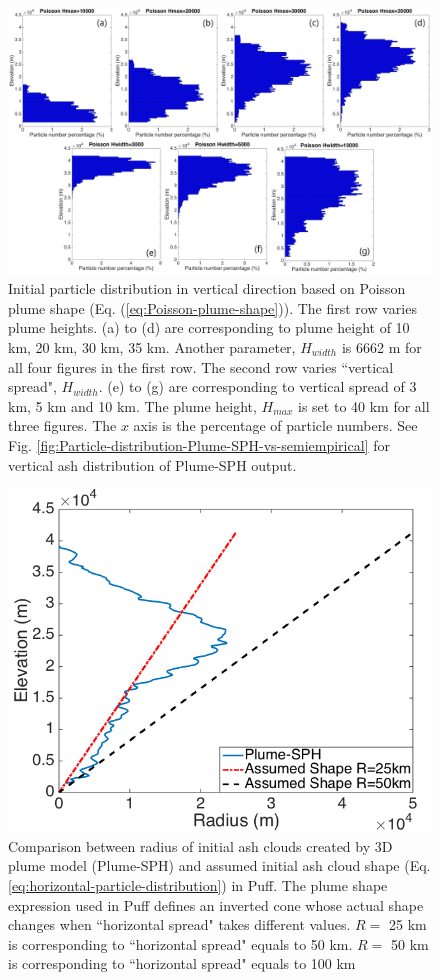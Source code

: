 \documentclass[utf8]{frontiersSCNS} %
\begin{document}
\begin{figure}[!htb]
\centering
\includegraphics[width=1.0\textwidth]{Figures/particle_distribution_vertical_calibration}
\caption{Initial particle distribution in vertical direction based on Poisson plume shape  (Eq. (\ref{eq:Poisson-plume-shape})). The first row varies plume heights. (a) to (d) are corresponding to plume height of 10 km, 20 km, 30 km, 35 km. Another parameter, $H_{width}$ is 6662 m for all four figures in the first row. The second row varies ``vertical spread", $H_{width}$. (e) to (g) are corresponding to vertical spread of 3 km, 5 km and 10 km. The plume height, $H_{max}$ is set to 40 km for all three figures. The $x$ axis is the percentage of particle numbers. See Fig. \ref{fig:Particle-distribution-Plume-SPH-vs-semiempirical} for vertical ash distribution of Plume-SPH output.}
\label{fig:Particle-distribution-Plume-calibrate-semiempirical}
\end{figure}

\begin{figure}[!htb]
\centering
\includegraphics[width=0.50 \textwidth]{Figures/radius-Plume-SPH-And-Assumed}
\caption{Comparison between radius of initial ash clouds created by 3D plume model (Plume-SPH) and assumed initial ash cloud shape (Eq. \ref{eq:horizontal-particle-distribution}) in Puff. The plume shape expression used in Puff defines an inverted cone whose actual shape changes when ``horizontal spread" takes different values. $R=$ 25 km is corresponding to ``horizontal spread" equals to 50 km. $R=$ 50 km is corresponding to ``horizontal spread" equals to 100 km}
\label{fig:radius-comparison}
\end{figure}
\end{document}
